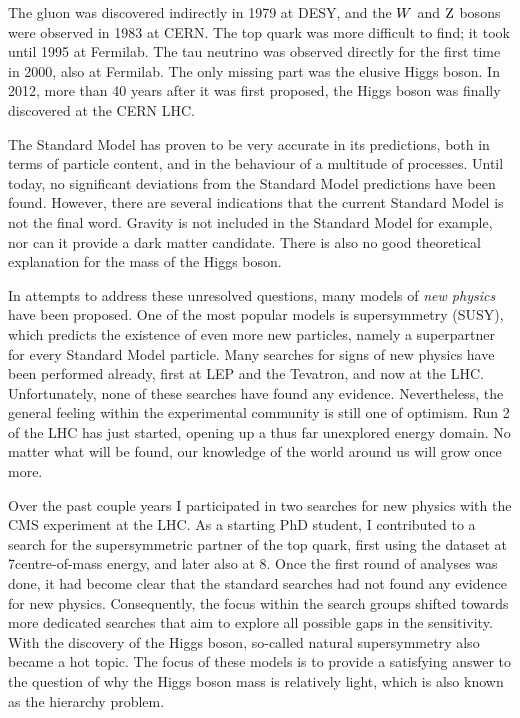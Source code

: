 The gluon was discovered indirectly in 1979 at DESY, and the $W$ and $\mathrm{Z}$ bosons were observed
in 1983 at CERN. The top quark was more difficult to find; it took until 1995 at Fermilab. The tau
neutrino was observed directly for the first time in 2000, also at Fermilab. The only missing part
was the elusive Higgs boson. In 2012, more than 40 years after it was first proposed, the Higgs
boson was finally discovered at the CERN LHC.

The Standard Model has proven to be very accurate in its predictions, both in terms of particle
content, and in the behaviour of a multitude of processes. Until today, no significant deviations
from the Standard Model predictions have been found. However, there are several indications that the
current Standard Model is not the final word. Gravity is not included in the Standard Model for
example, nor can it provide a dark matter candidate. There is also no good theoretical explanation
for the mass of the Higgs boson. 

In attempts to address these unresolved questions, many models of \textit{new physics} have been
proposed. One of the most popular models is supersymmetry (SUSY), which predicts the existence of
even more new particles, namely a superpartner for every Standard Model particle. 
Many searches for signs of new physics have been performed already, first at LEP and the Tevatron,
and now at the LHC. Unfortunately, none of these searches have found any evidence.
Nevertheless, the general feeling within the experimental community is still one of optimism.
Run 2 of the LHC has just started, opening up a thus far unexplored energy domain. 
No matter what will be found, our knowledge of the world around us will grow once more. 

Over the past couple years I participated in two searches for new physics with the CMS experiment at
the LHC. As a starting PhD student, I contributed to a search for the supersymmetric partner of the
top quark, first using the dataset at 7\TeV centre-of-mass energy, and later also at 8\TeV. 
Once the first round of analyses was done, it had become clear that the standard searches had not
found any evidence for new physics. Consequently, the focus within the search groups shifted towards
more dedicated searches that aim to explore all possible gaps in the sensitivity. 
With the discovery of the Higgs boson, so-called natural supersymmetry also became a hot topic. 
The focus of these models is to provide a satisfying answer to the question of why the Higgs boson
mass is relatively light, which is also known as the hierarchy problem. 

